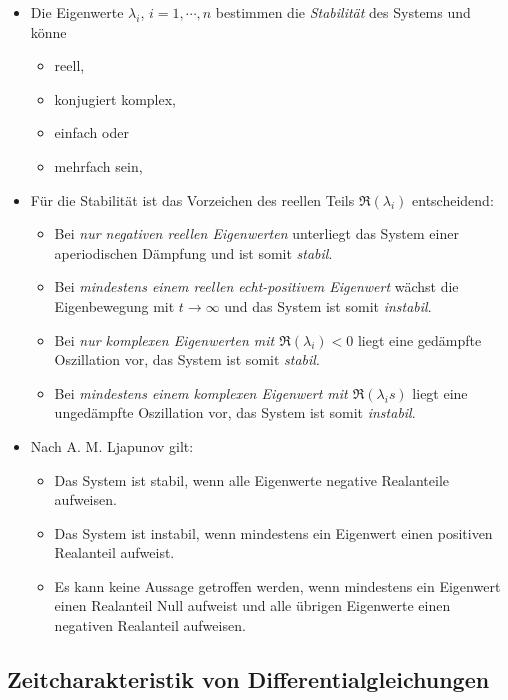 			\begin{itemize}
				\item Die Eigenwerte \( \lambda _ i \), \( i = 1, \cdots, n \) bestimmen die \textit{Stabilität} des Systems und könne
					\begin{itemize}
						\item reell,
						\item konjugiert komplex,
						\item einfach oder
						\item mehrfach sein,
					\end{itemize}
				\item Für die Stabilität ist das Vorzeichen des reellen Teils \( \Re(\lambda _ i) \) entscheidend:
					\begin{itemize}
						\item Bei \textit{nur negativen reellen Eigenwerten} unterliegt das System einer aperiodischen Dämpfung und ist somit \textit{stabil}.
						\item Bei \textit{mindestens einem reellen echt-positivem Eigenwert} wächst die Eigenbewegung mit \( t \rightarrow \infty \) und das System ist somit \textit{instabil}.
						\item Bei \textit{nur komplexen Eigenwerten mit \( \Re(\lambda _ i) < 0 \)} liegt eine gedämpfte Oszillation vor, das System ist somit \textit{stabil}.
						\item Bei \textit{mindestens einem komplexen Eigenwert mit \( \Re(\lambda _ is) \)} liegt eine ungedämpfte Oszillation vor, das System ist somit \textit{instabil}.
					\end{itemize}
				\item Nach A. M. Ljapunov gilt:
					\begin{itemize}
						\item Das System ist stabil, wenn alle Eigenwerte negative Realanteile aufweisen.
						\item Das System ist instabil, wenn mindestens ein Eigenwert einen positiven Realanteil aufweist.
						\item Es kann keine Aussage getroffen werden, wenn mindestens ein Eigenwert einen Realanteil Null aufweist und alle übrigen Eigenwerte einen negativen Realanteil aufweisen.
					\end{itemize}
			\end{itemize}

		\subsection{Zeitcharakteristik von Differentialgleichungen}
			\label{sec:mathezeitCharakteristik}

